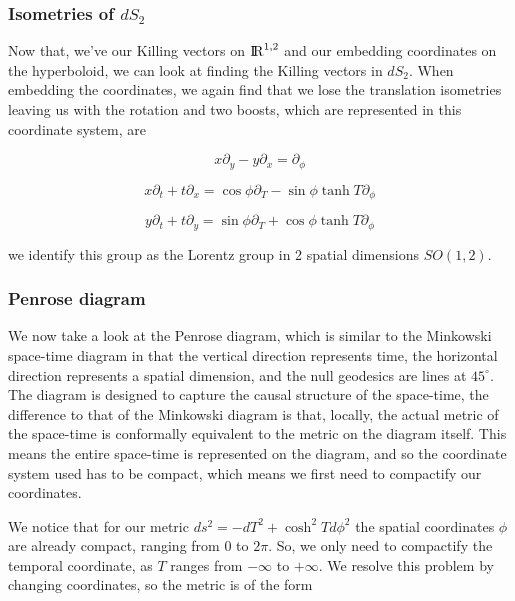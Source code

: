 \documentclass[a4paper,11pt]{article}
\numberwithin{equation}{section}
\numberwithin{figure}{section}
\begin{document}
\begin{large}
\subsubsection{Isometries of $dS_2$}

Now that, we've our Killing vectors on ${\rm I\!R}^{1,2}$ and our embedding coordinates on the hyperboloid, we can look at finding the Killing vectors in $dS_2$. When embedding the coordinates, we again find that we lose the translation isometries leaving us with the rotation and two boosts, which are represented in this coordinate system, are


\begin{equation}
\label{eq:xyrot_dS}
x\partial_y-y\partial_x=\partial_\phi
\end{equation}


\begin{equation}
\label{eq:xboost}
x\partial_t+t\partial_x=\cos\phi \partial_T-\sin\phi\tanh T \partial_\phi
\end{equation}


\begin{equation}
\label{eq:yboost}
y\partial_t+t\partial_y=\sin\phi \partial_T+\cos\phi\tanh T\partial_\phi
\end{equation}

\vspace{0.5cm}

we identify this group as the Lorentz group in 2 spatial dimensions $SO(1,2)$.


\newpage


\subsubsection{Penrose diagram}

We now take a look at the Penrose diagram, which is similar to the Minkowski space-time diagram in that the vertical direction represents time, the horizontal direction represents a spatial dimension, and the null geodesics are lines at $45^{\circ}$. The diagram is designed to capture the causal structure of the space-time, the difference to that of the Minkowski diagram is that, locally, the actual metric of the space-time is conformally equivalent to the metric on the diagram itself. This means the entire space-time is represented on the diagram, and so the coordinate system used has to be compact, which means we first need to compactify our coordinates.

We notice that for our metric $ds^2=-dT^2+\cosh^2T d\phi^2$ the spatial coordinates $\phi$ are already compact, ranging from $0$ to $2\pi$. So, we only need to compactify the temporal coordinate, as $T$ ranges from $-\infty$ to $+\infty$. We resolve this problem by changing coordinates, so the metric is of the form


\end{large}
\end{document}
